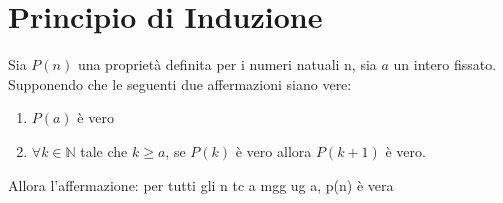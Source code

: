 \chapter{Principio di Induzione}

\begin{defn}
Sia $P(n)$ una proprietà definita per i numeri natuali n, sia $a$ un intero fissato.
Supponendo che le seguenti due affermazioni siano vere:
\begin{enumerate}
	\item $P(a)$ è vero
	\item $\forall k \in \mathbb{N}$ tale che $k \geqslant a$, se $P(k)$ è vero allora
	$P(k+1)$ è vero.
\end{enumerate}
Allora l'affermazione: per tutti gli n tc a mgg ug a, p(n) è vera
\end{defn}